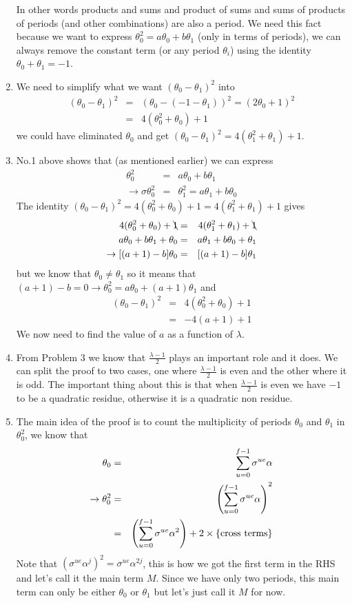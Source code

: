 \documentclass[aps,preprint,preprintnumbers,nofootinbib,showpacs,prd]{revtex4-1}
\newcommand{\nbea}{\begin{eqnarray*}}
\newcommand{\neea}{\end{eqnarray*}}
\begin{document}
\begin{enumerate}
In other words products and sums and product of sums and sums of products of periods (and other combinations) are also a period. We need this fact because we want to express $\theta_0^2 = a\theta_0 + b\theta_1$ (only in terms of periods), we can always remove the constant term (or any period $\theta_i$) using the identity $\theta_0 + \theta_1 = -1$.
%
\item We need to simplify what we want $(\theta_0 - \theta_1)^2$ into
%
\nbea
(\theta_0 - \theta_1)^2 & = & (\theta_0 - (-1 - \theta_1))^2 = (2\theta_0 + 1)^2 \\
& = & 4(\theta_0^2 + \theta_0) + 1
\neea
%
we could have eliminated $\theta_0$ and get $(\theta_0 - \theta_1)^2 = 4(\theta_1^2 + \theta_1) + 1$.
%
\item No.1 above shows that (as mentioned earlier) we can express
%
\nbea
\theta_0^2 & = & a\theta_0 + b\theta_1 \\
\to \sigma \theta_0^2 & = & \theta_1^2 = a\theta_1 + b\theta_0
\neea
%
The identity $(\theta_0 - \theta_1)^2 = 4(\theta_0^2 + \theta_0) + 1 = 4(\theta_1^2 + \theta_1) + 1$ gives
%
\nbea
4(\theta_0^2 + \theta_0) + \bcancel{1} & = & 4(\theta_1^2 + \theta_1) + \bcancel{1} \\
a\theta_0 + b\theta_1 +\theta_0 & = & a\theta_1 + b\theta_0 +\theta_1 \\
\to [(a+1) - b] \theta_0 & = & [(a+1) - b]\theta_1
\neea
%
but we know that $\theta_0 \neq \theta_1$ so it means that $(a+1) - b = 0 \to \theta_0^2 = a\theta_0 + (a+1)\theta_1$ and
%
\nbea
(\theta_0 - \theta_1)^2 & = & 4(\theta_0^2 + \theta_0) + 1 \\
& = & -4(a+1) + 1
\neea
%
We now need to find the value of $a$ as a function of $\lambda$.
%
\item From Problem 3 we know that $\frac{\lambda - 1}{2}$ plays an important role and it does. We can split the proof to two cases, one where $\frac{\lambda - 1}{2}$ is even and the other where it is odd. The important thing about this is that when $\frac{\lambda - 1}{2}$ is even we have $-1$ to be a quadratic residue, otherwise it is a quadratic non residue.
%
 \item The main idea of the proof is to count the multiplicity of periods $\theta_0$ and $\theta_1$ in $\theta_0^2$, we know that
 \nbea
 \theta_0 & = & \sum_{u=0}^{f-1} \sigma^{ue}\alpha \\
 \to \theta_0^2 & = & \left ( \sum_{u=0}^{f-1} \sigma^{ue}\alpha \right )^2 \\
 & = & \left ( \sum_{u=0}^{f-1} \sigma^{ue}\alpha^2 \right ) + 2 \times \{{\rm cross~terms}\}
 \neea
Note that $(\sigma^{ue}\alpha^j)^2 = \sigma^{ue}\alpha^{2j}$, this is how we got the first term in the RHS and let's call it the main term $M$. Since we have only two periods, this main term can only be either $\theta_0$ or $\theta_1$ but let's just call it $M$ for now.


\end{enumerate}
\end{document}

